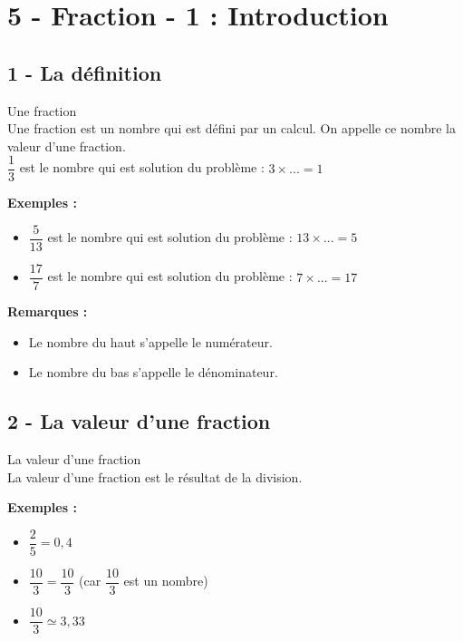 



\section*{5 - Fraction - 1 : Introduction}

\subsection*{1 - La définition}

\begin{Definition}{Une fraction}\\
  Une fraction est un nombre qui est défini par un calcul. On appelle ce nombre la valeur d'une fraction. \\
  $\dfrac{1}{3}$ est le nombre qui est solution du problème : $3 \times ... = 1$
\end{Definition}

\textbf{Exemples : }

\begin{itemize}[label={$\bullet$}]
  \item $\dfrac{5}{13}$ est le nombre qui est solution du problème : $13 \times ... = 5$
  \item $\dfrac{17}{7}$ est le nombre qui est solution du problème : $7 \times ... = 17$
\end{itemize}

\textbf{Remarques : }

\begin{itemize}[label={$\bullet$}]
  \item Le nombre du haut s'appelle le numérateur.
  \item Le nombre du bas s'appelle le dénominateur.
\end{itemize}

\subsection*{2 - La valeur d'une fraction}

\begin{Definition}{La valeur d'une fraction}\\
  La valeur d'une fraction est le résultat de la division.
\end{Definition}

\textbf{Exemples : }

\begin{itemize}[label={$\bullet$}]
  \item $\dfrac{2}{5} = 0,4$
  \item $\dfrac{10}{3} = \dfrac{10}{3} $ (car $\dfrac{10}{3}$ est un nombre)
  \item $\dfrac{10}{3} \simeq  3,33 $
\end{itemize}

